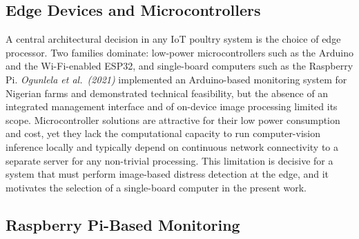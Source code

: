 \documentclass[12pt,a4paper]{report}
\begin{document}
\subsection{Edge Devices and Microcontrollers}

A central architectural decision in any IoT poultry system is the choice of edge processor. Two families dominate: low-power microcontrollers such as the Arduino and the Wi-Fi-enabled ESP32, and single-board computers such as the Raspberry Pi. \textit{Ogunlela et al.\ (2021)} implemented an Arduino-based monitoring system for Nigerian farms and demonstrated technical feasibility, but the absence of an integrated management interface and of on-device image processing limited its scope. Microcontroller solutions are attractive for their low power consumption and cost, yet they lack the computational capacity to run computer-vision inference locally and typically depend on continuous network connectivity to a separate server for any non-trivial processing. This limitation is decisive for a system that must perform image-based distress detection at the edge, and it motivates the selection of a single-board computer in the present work.

\subsection{Raspberry Pi-Based Monitoring}
\end{document}
